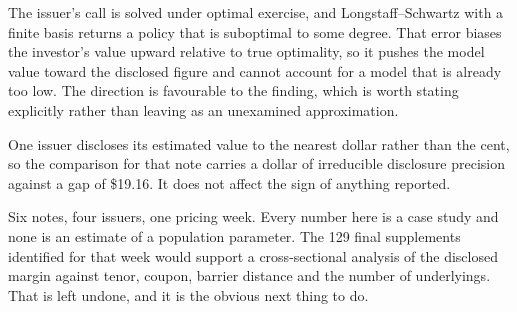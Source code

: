 The issuer's call is solved under optimal exercise, and Longstaff--Schwartz
with a finite basis returns a policy that is suboptimal to some degree. That
error biases the investor's value upward relative to true optimality, so it
pushes the model value toward the disclosed figure and cannot account for a
model that is already too low. The direction is favourable to the finding,
which is worth stating explicitly rather than leaving as an unexamined
approximation.

One issuer discloses its estimated value to the nearest dollar rather than the
cent, so the comparison for that note carries a dollar of irreducible
disclosure precision against a gap of \$19.16. It does not affect the sign of
anything reported.

Six notes, four issuers, one pricing week. Every number here is a case study
and none is an estimate of a population parameter. The 129 final supplements
identified for that week would support a cross-sectional analysis of the
disclosed margin against tenor, coupon, barrier distance and the number of
underlyings. That is left undone, and it is the obvious next thing to do.
